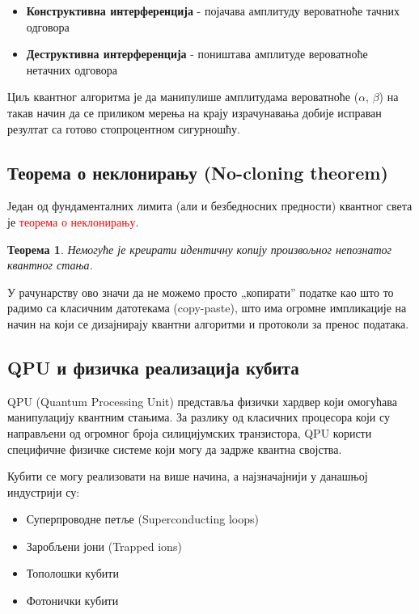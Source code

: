 \documentclass[12pt]{article}
\theoremstyle{plain}
\newtheorem{teorema}{Теорема}[section]
\theoremstyle{definition}
\begin{document}
	\begin{itemize}
		\item \textbf{Конструктивна интерференција} - појачава амплитуду вероватноће тачних одговора
		\item \textbf{Деструктивна интерференција} - поништава амплитуде вероватноће нетачних одговора
	\end{itemize}
	
	\noindent Циљ квантног алгоритма је да манипулише амплитудама вероватноће ($\alpha$, $\beta$) на такав начин да се приликом мерења на крају израчунавања добије исправан резултат са готово стопроцентном сигурношћу.
	
	\subsection{Теорема о неклонирању (No-cloning theorem)}
	Један од фундаменталних лимита (али и безбедносних предности) квантног света је \textcolor{red}{теорема о неклонирању}.
	
	\begin{teorema}
		Немогуће је креирати идентичну копију произвољног непознатог квантног стања.
	\end{teorema}
	
	\noindent У рачунарству ово значи да не можемо просто „копирати” податке као што то радимо са класичним датотекама (copy-paste), што има огромне импликације на начин на који се дизајнирају квантни алгоритми и протоколи за пренос података.
	
	\subsection{QPU и физичка реализација кубита}
	QPU (Quantum Processing Unit) представља физички хардвер који омогућава манипулацију квантним стањима. За разлику од класичних процесора који су направљени од огромног броја силицијумских транзистора, QPU користи специфичне физичке системе који могу да задрже квантна својства.
	
	Кубити се могу реализовати на више начина, а најзначајнији у данашњој индустрији су:
	
	\begin{itemize}
		\item Суперпроводне петље (Superconducting loops)
		\item Заробљени јони (Trapped ions)
		\item Тополошки кубити
		\item Фотонички кубити
	\end{itemize}
	
\end{document}
